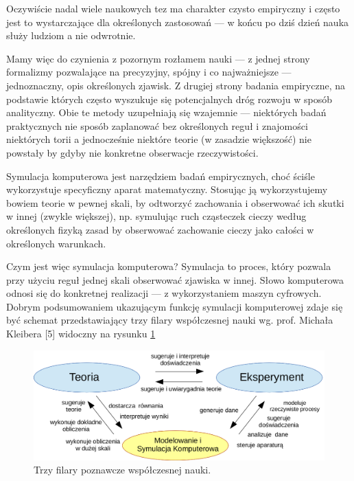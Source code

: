 \par{
Oczywiście nadal wiele naukowych tez ma charakter czysto empiryczny i często jest to wystarczające dla określonych zastosowań --- w końcu po dziś dzień nauka służy ludziom a nie odwrotnie.
}

\par{
Mamy więc do czynienia z pozornym rozłamem nauki --- z jednej strony formalizmy pozwalające na precyzyjny, spójny i co najważniejsze --- jednoznaczny, opis określonych zjawisk. Z drugiej strony badania empiryczne, na podstawie których często wyszukuje się potencjalnych dróg rozwoju w sposób analityczny. Obie te metody uzupełniają się wzajemnie --- niektórych badań praktycznych nie sposób zaplanować bez określonych reguł i znajomości niektórych torii a jednocześnie niektóre teorie (w zasadzie większość) nie powstały by gdyby nie konkretne obserwacje rzeczywistości.
}

\par{
Symulacja komputerowa jest narzędziem badań empirycznych, choć ściśle wykorzystuje specyficzny aparat matematyczny. Stosując ją wykorzystujemy bowiem teorie w pewnej skali, by odtworzyć zachowania i obserwować ich skutki w innej (zwykle większej), np. symulując ruch cząsteczek cieczy według określonych fizyką zasad by obserwować zachowanie cieczy jako całości w określonych warunkach.
}

\par{
Czym jest więc symulacja komputerowa? Symulacja to proces, który pozwala przy użyciu reguł jednej skali obserwować zjawiska w innej. Słowo komputerowa odnosi się do konkretnej realizacji --- z wykorzystaniem maszyn cyfrowych. Dobrym podsumowaniem ukazującym funkcję symulacji komputerowej zdaje się być schemat przedstawiający trzy filary współczesnej nauki wg. prof. Michała Kleibera [5] widoczny na rysunku \ref{filaryNauki}
\begin{figure}[htb]
    \begin{center}
	\includegraphics[angle=0,scale=0.4]{img/triada_poznania.png}
	\caption{Trzy filary poznawcze współczesnej nauki.}
	\label{filaryNauki}
    \end{center}
\end{figure}
}

